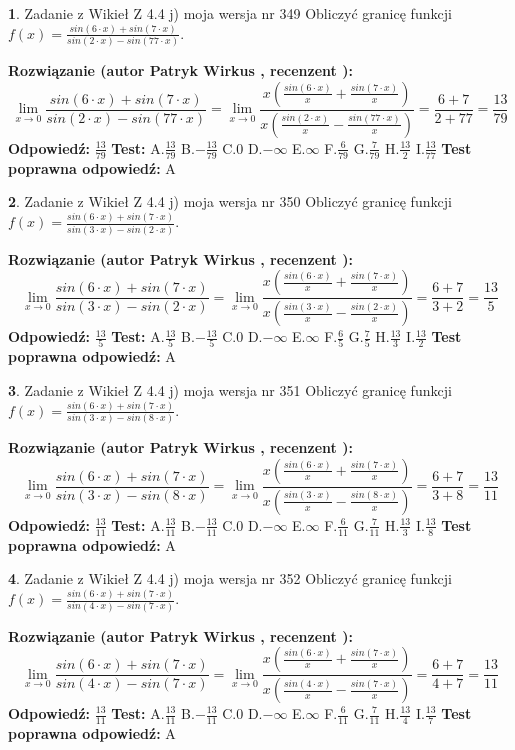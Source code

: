 \documentclass[12pt, a4paper]{article}
\theoremstyle{definition} %
\newtheorem{zad}{}
\newcommand{\zadStart}[1]{\begin{zad}#1\newline}
\newcommand{\zadStop}{\end{zad}}
\newcommand{\rozwStart}[2]{\noindent \textbf{Rozwiązanie (autor #1 , recenzent #2): }\newline}
\newcommand{\rozwStop}{\newline}
\newcommand{\odpStart}{\noindent \textbf{Odpowiedź:}\newline}
\newcommand{\odpStop}{\newline}
\newcommand{\testStart}{\noindent \textbf{Test:}\newline}
\newcommand{\testStop}{\newline}
\newcommand{\kluczStart}{\noindent \textbf{Test poprawna odpowiedź:}\newline}
\newcommand{\kluczStop}{\newline}
\begin{document}
\zadStart{Zadanie z Wikieł Z 4.4 j) moja wersja nr 349}
Obliczyć granicę funkcji $f(x)=\frac{sin(6\cdot x) +sin(7\cdot x)}{sin(2\cdot x) -sin(77\cdot x)}$.
\zadStop
\rozwStart{Patryk Wirkus}{}
$$\lim\limits_{x\to 0}\frac{sin(6\cdot x) +sin(7\cdot x)}{sin(2\cdot x) -sin(77\cdot x)}=\lim\limits_{x\to 0}\frac{x(\frac{sin(6\cdot x)}{x}+\frac{sin(7\cdot x)}{x})}{x(\frac{sin(2\cdot x)}{x}-\frac{sin(77\cdot x)}{x})}=\frac{6+7}{2+77} = \frac{13}{79}$$
\rozwStop
\odpStart
$\frac{13}{79}$
\odpStop
\testStart
A.$\frac{13}{79}$
B.$-\frac{13}{79}$
C.$0$
D.$-\infty$
E.$\infty$
F.$\frac{6}{79}$
G.$\frac{7}{79}$
H.$\frac{13}{2}$
I.$\frac{13}{77}$
\testStop
\kluczStart
A
\kluczStop



\zadStart{Zadanie z Wikieł Z 4.4 j) moja wersja nr 350}
Obliczyć granicę funkcji $f(x)=\frac{sin(6\cdot x) +sin(7\cdot x)}{sin(3\cdot x) -sin(2\cdot x)}$.
\zadStop
\rozwStart{Patryk Wirkus}{}
$$\lim\limits_{x\to 0}\frac{sin(6\cdot x) +sin(7\cdot x)}{sin(3\cdot x) -sin(2\cdot x)}=\lim\limits_{x\to 0}\frac{x(\frac{sin(6\cdot x)}{x}+\frac{sin(7\cdot x)}{x})}{x(\frac{sin(3\cdot x)}{x}-\frac{sin(2\cdot x)}{x})}=\frac{6+7}{3+2} = \frac{13}{5}$$
\rozwStop
\odpStart
$\frac{13}{5}$
\odpStop
\testStart
A.$\frac{13}{5}$
B.$-\frac{13}{5}$
C.$0$
D.$-\infty$
E.$\infty$
F.$\frac{6}{5}$
G.$\frac{7}{5}$
H.$\frac{13}{3}$
I.$\frac{13}{2}$
\testStop
\kluczStart
A
\kluczStop



\zadStart{Zadanie z Wikieł Z 4.4 j) moja wersja nr 351}
Obliczyć granicę funkcji $f(x)=\frac{sin(6\cdot x) +sin(7\cdot x)}{sin(3\cdot x) -sin(8\cdot x)}$.
\zadStop
\rozwStart{Patryk Wirkus}{}
$$\lim\limits_{x\to 0}\frac{sin(6\cdot x) +sin(7\cdot x)}{sin(3\cdot x) -sin(8\cdot x)}=\lim\limits_{x\to 0}\frac{x(\frac{sin(6\cdot x)}{x}+\frac{sin(7\cdot x)}{x})}{x(\frac{sin(3\cdot x)}{x}-\frac{sin(8\cdot x)}{x})}=\frac{6+7}{3+8} = \frac{13}{11}$$
\rozwStop
\odpStart
$\frac{13}{11}$
\odpStop
\testStart
A.$\frac{13}{11}$
B.$-\frac{13}{11}$
C.$0$
D.$-\infty$
E.$\infty$
F.$\frac{6}{11}$
G.$\frac{7}{11}$
H.$\frac{13}{3}$
I.$\frac{13}{8}$
\testStop
\kluczStart
A
\kluczStop



\zadStart{Zadanie z Wikieł Z 4.4 j) moja wersja nr 352}
Obliczyć granicę funkcji $f(x)=\frac{sin(6\cdot x) +sin(7\cdot x)}{sin(4\cdot x) -sin(7\cdot x)}$.
\zadStop
\rozwStart{Patryk Wirkus}{}
$$\lim\limits_{x\to 0}\frac{sin(6\cdot x) +sin(7\cdot x)}{sin(4\cdot x) -sin(7\cdot x)}=\lim\limits_{x\to 0}\frac{x(\frac{sin(6\cdot x)}{x}+\frac{sin(7\cdot x)}{x})}{x(\frac{sin(4\cdot x)}{x}-\frac{sin(7\cdot x)}{x})}=\frac{6+7}{4+7} = \frac{13}{11}$$
\rozwStop
\odpStart
$\frac{13}{11}$
\odpStop
\testStart
A.$\frac{13}{11}$
B.$-\frac{13}{11}$
C.$0$
D.$-\infty$
E.$\infty$
F.$\frac{6}{11}$
G.$\frac{7}{11}$
H.$\frac{13}{4}$
I.$\frac{13}{7}$
\testStop
\kluczStart
A
\kluczStop
\end{document}
